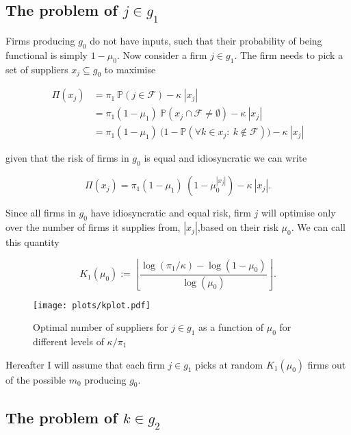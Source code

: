 \documentclass[american, abstract=on]{scrartcl}
\newcommand{\F}{\mathcal{F}}
\renewcommand{\P}{\mathbb{P}}
\newcommand{\abs}[1]{\left\lvert#1\right\rvert}
\begin{document}
\subsection[The problem of good one]{The problem of $j \in g_1$}

Firms producing $g_0$ do not have inputs, such that their probability of being functional is simply $1 - \mu_0$. Now consider a firm $j \in g_1$. The firm needs to pick a set of suppliers $x_j \subseteq g_0$ to maximise

\begin{equation}
  \begin{split}
    \Pi(x_j) &= \pi_1 \ \P(j \in \F) - \kappa \ \abs{x_j} \\
    &= \pi_1 (1 - \mu_1) \  \P(x_j \cap \F \neq \emptyset) - \kappa \ \abs{x_j} \\
    &= \pi_1 (1 - \mu_1) \  \Big(1 - \P\left(\forall k \in x_j: \ k \notin \F \right) \Big) - \kappa \ \abs{x_j}
  \end{split}
\end{equation}

given that the risk of firms in $g_0$ is equal and idiosyncratic we can write

\begin{equation}
    \Pi(x_j) = \pi_1 (1 - \mu_1) \  \left(1 - \mu_0^{\abs{x_j}}\right) - \kappa \ \abs{x_j}.
\end{equation}

Since all firms in $g_0$ have idiosyncratic and equal risk, firm $j$ will optimise only over the number of firms it supplies from, $\abs{x_j}$,based on their risk $\mu_0$. We can call this quantity

\begin{equation}
  K_1(\mu_0) := \left\lfloor \frac{\log(\pi_1 / \kappa) - \log(1 - \mu_0)}{\log(\mu_0)} \right\rfloor.
\end{equation}

\begin{figure}[H]
  \centering
  \texttt{[image: plots/kplot.pdf]} 
  \caption{Optimal number of suppliers for $j \in g_1$ as a function of $\mu_0$ for different levels of $\kappa / \pi_1$}
  \label{fig:kplot}
\end{figure}

Hereafter I will assume that each firm $j \in g_1$ picks at random $K_1(\mu_0)$ firms out of the possible $m_0$ producing $g_0$.

\subsection[The problem of good two]{The problem of $k \in g_2$}
\end{document}
